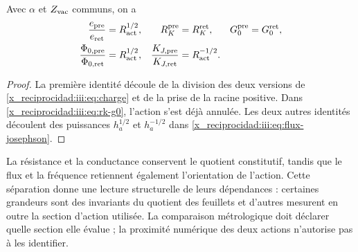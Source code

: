 \begin{proposition}
Avec $\alpha$ et $Z_{\rm vac}$ communs, on a
\begin{align}
 \frac{e_{\rm pre}}{e_{\rm ret}}&=R_{\rm act}^{1/2},
 &R_K^{\rm pre}&=R_K^{\rm ret},
 &G_0^{\rm pre}&=G_0^{\rm ret},\label{x_reciprocidad:iii:eq:charge-return}\\
 \frac{\Phi_{0,\rm pre}}{\Phi_{0,\rm ret}}&=R_{\rm act}^{1/2},
 &\frac{K_{J,\rm pre}}{K_{J,\rm ret}}&=R_{\rm act}^{-1/2}.
 \label{x_reciprocidad:iii:eq:flux-return}
\end{align}
\end{proposition}
\begin{proof}
La première identité découle de la division des deux versions de
\eqref{x_reciprocidad:iii:eq:charge} et de la prise de la racine positive. Dans
\eqref{x_reciprocidad:iii:eq:rk-g0}, l’action s’est déjà annulée. Les deux autres
identités découlent des puissances $h_a^{1/2}$ et $h_a^{-1/2}$ dans
\eqref{x_reciprocidad:iii:eq:flux-josephson}.
\end{proof}

La résistance et la conductance conservent le quotient constitutif, tandis que le flux et la fréquence retiennent également l'orientation de l'action. Cette séparation donne une lecture structurelle de leurs dépendances : certaines grandeurs sont des invariants du quotient des feuillets et d'autres mesurent en outre la section d'action utilisée. La comparaison métrologique doit déclarer quelle section elle évalue ; la proximité numérique des deux actions n'autorise pas à les identifier.




